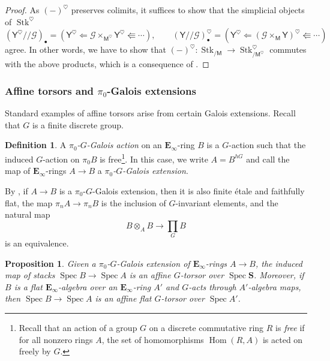 \documentclass[11pt, a4paper]{article}
\DeclareMathOperator{\Spec}{Spec}
\newcommand{\1}{\mathbf{1}}
\newcommand{\Sph}{\mathbf{S}}
\DeclareMathOperator{\Stk}{Stk}
\DeclareMathOperator{\Hom}{Hom}
\newcommand{\E}{\mathbf{E}}
\newcommand{\calG}{\mathcal{G}}
\newcommand{\M}{\mathsf{M}}
\newcommand{\Y}{\mathsf{Y}}
\theoremstyle{plain}
\newtheorem{prop}[equation]{Proposition}
\theoremstyle{definition}
\newtheorem{mydef}[equation]{Definition}
\theoremstyle{remark}\numberwithin{equation}{section}
\begin{document}
\begin{proof}
    As $(-)^\heartsuit$ preserves colimits, it suffices to show that the simplicial objects of $\Stk^\heartsuit$
    \[(\Y^\heartsuit//\calG)_\bullet = \left(\Y^\heartsuit \Leftarrow \calG \times_{\M^\heartsuit} \Y^\heartsuit \Lleftarrow \cdots\right), \qquad (\Y//\calG)_\bullet^\heartsuit = \left(\Y^\heartsuit \Leftarrow (\calG \times_{\M} \Y)^\heartsuit \Lleftarrow \cdots\right)\]
    agree. In other words, we have to show that $(-)^\heartsuit \colon \Stk_{/\M} \to \Stk^\heartsuit_{/\M^\heartsuit}$ commutes with the above products, which is a consequence of \cite[Pr.3.4.3.3]{reconstruction}.
\end{proof}

\subsubsection{Affine torsors and \texorpdfstring{$\pi_0$}{pi0}-Galois extensions}
Standard examples of affine torsors arise from certain {Galois extensions}. Recall that $G$ is a finite discrete group.

\begin{mydef}\label{df:lurie_galois}
    A \emph{$\pi_0$-$G$-Galois action} on an $\E_\infty$-ring $B$ is a $G$-action such that the induced $G$-action on $\pi_0 B$ is free\footnote{Recall that an action of a group $G$ on a discrete commutative ring $R$ is \emph{free} if for all nonzero rings $A$, the set of homomorphisms $\Hom(R,A)$ is acted on freely by $G$.}. In this case, we write $A=B^{hG}$ and call the map of $\E_\infty$-rings $A \to B$ a \emph{$\pi_0$-$G$-Galois extension}.
\end{mydef}

By \cite[Pr.B.7.5.5]{sag}, if $A \to B$ is a $\pi_0$-$G$-Galois extension, then it is also finite étale and faithfully flat, the map $\pi_n A \to \pi_n B$ is the inclusion of $G$-invariant elements, and the natural map
\begin{equation}\label{eq:pi0galoisisgalois}
B\otimes_A B \to \prod_G B
\end{equation}
is an equivalence.

\begin{prop}\label{pr:pi0galois_to_torsor}
    Given a $\pi_0$-$G$-Galois extension of $\E_\infty$-rings $A\to B$, the induced map of stacks $\Spec B \to \Spec A$ is an affine $G$-torsor over $\Spec \Sph$. Moreover, if $B$ is a flat $\E_\infty$-algebra over an $\E_\infty$-ring $A'$ and $G$-acts through $A'$-algebra maps, then $\Spec B \to \Spec A$ is an affine flat $G$-torsor over $\Spec A'$.
\end{prop}
\end{document}
